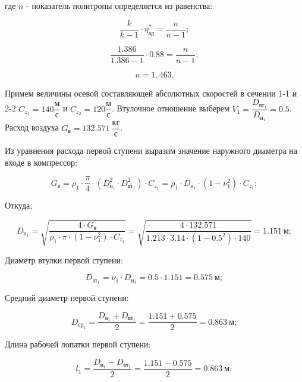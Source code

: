 где $n$ - показатель политропы определяется из равенства:

\begin{equation} \label{eu_eqn}
	\dfrac{k}{k-1}\cdot \eta_{\text{ад}}^*=\dfrac{n}{n-1};
\end{equation}

$$\dfrac{1.386}{1.386-1}\cdot 0.88=\dfrac{n}{n-1};$$

$$n = 1,463.$$

Примем величины осевой составляющей абсолютных скоростей в сечении 1-1 и 2-2 $C_{z_1}=140 \dfrac{\text{м}}{\text{с}}$ и $C_{z_2}=120 \dfrac{\text{м}}{\text{с}}$. Втулочное отношение выберем $V_{1}=\dfrac{D_{\text{вт}_{1}}}{D_{\text{н}_{1}}}=0.5$. Расход воздуха $G_{\text{в}}=132.571 \ \dfrac{\text{кг}}{\text{с}}$.

Из уравнения расхода первой ступени выразим значение наружного диаметра на входе в компрессор:

\begin{equation} \label{eu_eqn}
	G_{\text{в}}=\rho_{1}\cdot \dfrac{\pi}{4}\cdot(D_{\text{н}_{1}}^2\cdot D^2_{\text{вт}_{1}})\cdot C_{z_{1}}=\rho_{1}\cdot D_{\text{н}_{1}}\cdot(1-\nu_{1}^2)\cdot C_{z_{1}};
\end{equation}

Откуда,

$$D_{\text{н}_{1}}=\sqrt{ \dfrac{4\cdot G_{\text{в}}}{\rho_{1}\cdot \pi\cdot(1-\nu_1^2)\cdot C_{z_{1}}} }=\sqrt{ \dfrac{4\cdot 132.571}{1.213\cdot 3.14\cdot (1-0.5^2)\cdot140} }=1.151 \ \text{м};$$

Диаметр втулки первой ступени:

\begin{equation} \label{eu_eqn}
	D_{\text{вт}_{1}}=\nu_{1}\cdot D_{\text{н}_{1}}=0.5\cdot 1.151=0.575 \ \text{м};
\end{equation}

Средний диаметр первой ступени:

\begin{equation} \label{eu_eqn}
	D_{\text{ср}_{1}}=\dfrac{D_{\text{н}_{1}}+D_{\text{вт}_{1}}}{2}=\dfrac{1.151+0.575}{2}=0.863 \ \text{м};
\end{equation}

Длина рабочей лопатки первой ступени:

\begin{equation} \label{eu_eqn}
	l_{1}=\dfrac{D_{\text{н}_{1}}-D_{\text{вт}_{1}}}{2}=\dfrac{1.151-0.575}{2}=0.863 \ \text{м};
\end{equation}

